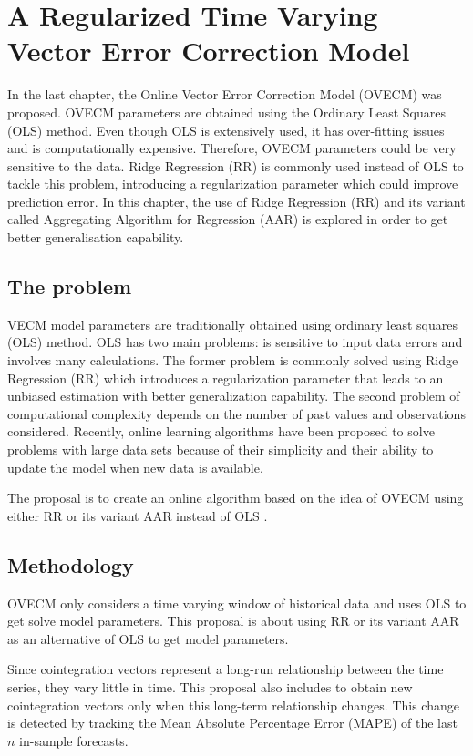 \chapter{A Regularized Time Varying Vector Error Correction Model}

In the last chapter, the Online Vector Error Correction Model (OVECM) was
proposed. OVECM parameters are obtained using the Ordinary Least Squares (OLS)
method. Even though OLS is extensively used, it has over-fitting issues and is
computationally expensive. Therefore, OVECM parameters could be very sensitive
to the data. Ridge Regression (RR) is commonly used instead of OLS to tackle
this problem, introducing a regularization parameter which could improve
prediction error. In this chapter, the use of Ridge Regression (RR) and its
variant called Aggregating Algorithm for Regression (AAR) is explored in order
to get better generalisation capability. 

\section{The problem}

VECM model parameters are traditionally obtained using ordinary least squares
(OLS) method. OLS has two main problems: is sensitive to input data errors
and involves many calculations. The former problem is commonly solved using
Ridge Regression (RR) \cite{hoerl1970} which introduces a regularization
parameter that leads to an unbiased estimation with better generalization
capability. The second problem of computational complexity depends on the number
of past values and observations considered.  Recently, online learning
algorithms have been proposed to solve problems with large data sets because of
their simplicity and their ability to update the model when new data is
available. 

The proposal is to create an online algorithm based on the idea of OVECM
using either RR or its variant AAR instead of OLS 
. 


\section{Methodology}

OVECM only considers a time varying window of historical data and uses OLS to
get solve model parameters. This proposal is about using RR or its variant AAR
as an alternative of OLS to get model parameters.

Since cointegration vectors represent a long-run relationship between the time
series, they vary little in time. This proposal also includes to obtain new
cointegration vectors only when this long-term relationship changes. This change
is detected by tracking the Mean Absolute Percentage Error (MAPE) of the last
$n$ in-sample forecasts.


